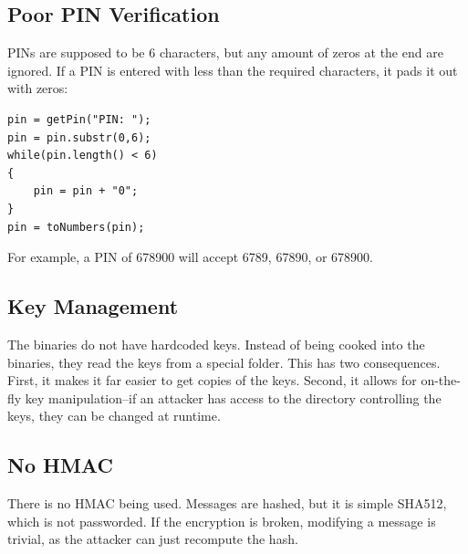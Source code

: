 \documentclass{article}
\begin{document}
\subsection{Poor PIN Verification}
PINs are supposed to be 6 characters, but any amount of zeros at the end are ignored. If a PIN is entered with less than the required characters, it pads it out with zeros:
\begin{lstlisting}
pin = getPin("PIN: ");
pin = pin.substr(0,6);
while(pin.length() < 6)
{
    pin = pin + "0";
}
pin = toNumbers(pin);
\end{lstlisting}
For example, a PIN of 678900 will accept 6789, 67890, or 678900.

\subsection{Key Management}
The binaries do not have hardcoded keys. Instead of being cooked into the binaries, they read the keys from a special folder. This has two consequences. First, it makes it far easier to get copies of the keys. Second, it allows for on-the-fly key manipulation--if an attacker has access to the directory controlling the keys, they can be changed at runtime.

\subsection{No HMAC}
There is no HMAC being used. Messages are hashed, but it is simple SHA512, which is not passworded. If the encryption is broken, modifying a message is trivial, as the attacker can just recompute the hash.
\end{document}
